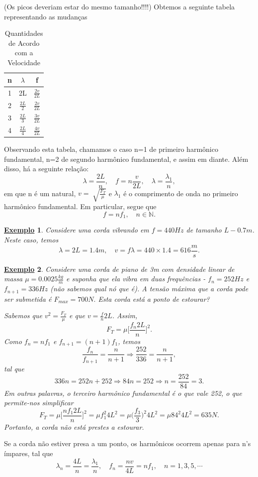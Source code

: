 \documentclass{article}
\newtheorem{example}{\underline{Exemplo}}
\begin{document}
(Os picos deveriam estar do mesmo tamanho!!!!)
Obtemos a seguinte tabela representando as mudanças
 \begin{center}
   \begin{table}[h!]
   \caption{Quantidades de Acordo com a Velocidade}
   \centering
     \begin{tabular}{| c | c | c |}
       \hline
       n & \(\lambda \) & f \\
       \hline
       1 & 2L & \(\frac{2v}{2L}\)\\
       2 & \(\frac{2L}{2}\) & \(\frac{2v}{2L}\)\\
       3 & \(\frac{2L}{3}\) & \(\frac{3v}{2L}\)\\
       4 & \(\frac{2L}{4}\) & \(\frac{4v}{2L}\)\\
       \hline
     \end{tabular}
   \end{table}
 \end{center}
 Observando esta tabela, chamamos o caso n=1 de primeiro harmônico fundamental, n=2 de segundo harmônico fundamental, e assim em diante. Além disso, há a seguinte relação: 
   \[
     \lambda = \frac{2L}{n},\quad f = n \frac{v}{2L},\quad \lambda = \frac{\lambda_{1}}{n},
   \]
   em que n é um natural, \(v = \sqrt[]{\frac{F_{T}}{\mu}}\) e \(\lambda_{1}\) é o comprimento de onda no primeiro harmônico fundamental. Em particular, segue que 
     \[
       f = n f_{1},\quad n\in \mathbb{N}.
     \]
\begin{example}
  Considere uma corda vibrando em \(f = 440Hz\) de tamanho \(L - 0.7m\). Neste caso, temos 
    \[
      \lambda  = 2L = 1.4m,\quad v = f\lambda = 440\times 1.4 = 616\frac{m}{s}.
    \]
\end{example}
\begin{example}
  Considere uma corda de piano de 3m com densidade linear de massa \(\mu = 0.0025 \frac{kg}{m}\) e suponha que ela vibra em duas frequências - \(f_{n} = 252Hz\) e \(f_{n+1} = 336Hz\)
(não sabemos qual nó que é). A tensão máxima que a corda pode ser submetida é \(F_{max} = 700N.\) Esta corda está a ponto de estourar?

Sabemos que \(v^{2} = \frac{F_{T}}{\mu}\) e que \(v = \frac{f}{n}2L\). Assim, 
  \[
    F_{T} = \mu \biggl[\frac{f_{n}2L}{n}\biggr]^{2}.
  \]
  Como \(f_{n} = nf_{1}\) e \(f_{n+1} = (n+1)f_{1}\), temos 
    \[
      \frac{f_{n}}{f_{n+1}} = \frac{n}{n+1} \Rightarrow \frac{252}{336} = \frac{n}{n+1},
    \]
tal que 
  \[
    336n = 252n + 252 \Rightarrow 84n = 252 \Rightarrow n = \frac{252}{84} = 3.
  \]
Em outras palavras, o terceiro harmônico fundamental é o que vale 252, o que permite-nos simplificar 
  \[
    F_{T} = \mu \biggl[\frac{nf_{1}2L}{n}\biggr]^{2} = \mu f_{1}^{2}4L^{2} = \mu \biggl(\frac{f_{3}}{3}\biggr)^{2}4L^{2} = \mu 84^{2}4L^{2} = 635N.
  \]
Portanto, a corda não está prestes a estourar.
\end{example}
  Se a corda não estiver presa a um ponto, os harmônicos ocorrem apenas para n's ímpares, tal que 
    \[
      \lambda_{n} = \frac{4L}{n} = \frac{\lambda_{1}}{n},\quad f_{n} = \frac{nv}{4L} = nf_{1},\quad n = 1, 3, 5, \cdots
    \]
\end{document}
